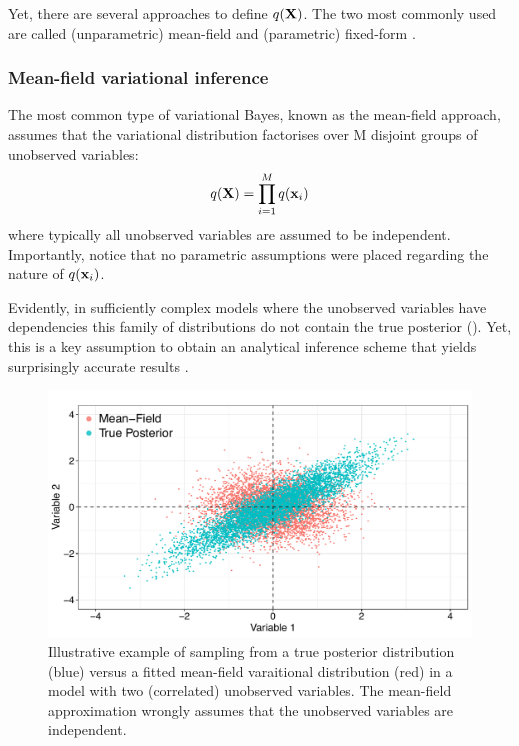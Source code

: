  Yet, there are several approaches to define $q({\bf X})$. The two most commonly used are called (unparametric) mean-field and (parametric) fixed-form \cite{Zhang2017,Blei2016}.

\subsubsection{Mean-field variational inference}  \label{section:mean_field}
The most common type of variational Bayes, known as the mean-field approach, assumes that the variational distribution factorises over M disjoint groups of unobserved variables\cite{Saul1996}:
\begin{equation} \label{eq:mean_field}
	q({\bf X}) = \prod_{i=1}^{M} q({\bf x}_i)
\end{equation}
where typically all unobserved variables are assumed to be independent. Importantly, notice that no parametric assumptions were placed regarding the nature of $q({\bf x}_i)$.

Evidently, in sufficiently complex models where the unobserved variables have dependencies this family of distributions do not contain the true posterior (). Yet, this is a key assumption to obtain an analytical inference scheme that yields surprisingly accurate results \cite{Blei2006,Faes2011,Braun2007}.

\begin{figure}[H]
	\centering
	\includegraphics[width=0.7\linewidth]{mean_field}
	\caption{Illustrative example of sampling from a true posterior distribution (blue) versus a fitted mean-field varaitional distribution (red) in a model with two (correlated) unobserved variables. The mean-field approximation wrongly assumes that the unobserved variables are independent.}
	\label{fig:mean_field}
\end{figure}

